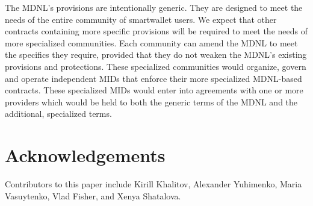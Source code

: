 \documentclass[11pt, oneside]{article}   	%
\begin{document}
The MDNL's provisions are intentionally generic. They are designed to meet the needs of the entire community of smartwallet users. We expect that other contracts containing more specific provisions will be required to meet the needs of more specialized communities. Each community can amend the MDNL to meet the specifics they require, provided that they do not weaken the MDNL's existing provisions and protections. These specialized communities would organize, govern and operate independent MIDs that enforce their more specialized MDNL-based contracts. These specialized MIDs would enter into agreements with one or more providers which would be held to both the generic terms of the MDNL and the additional, specialized terms.

\section{Acknowledgements} %
Contributors to this paper include Kirill Khalitov, Alexander Yuhimenko, Maria Vasuytenko, Vlad Fisher, and Xenya Shatalova.



\end{document}
